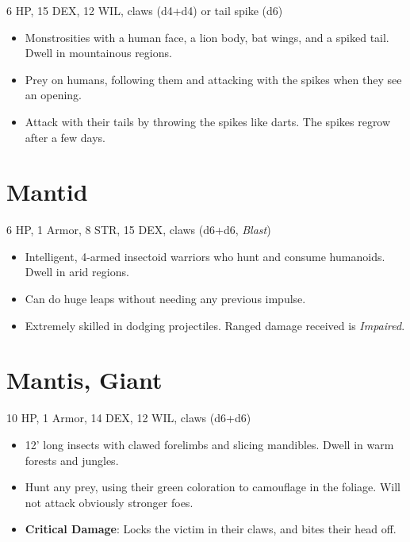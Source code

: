 \documentclass[
  10pt,
  american,
]{article}
\begin{document}
6 HP, 15 DEX, 12 WIL, claws (d4+d4) or tail spike (d6)

\begin{samepage}
\begin{itemize}
\setlength\itemsep{-.5em}
\item Monstrosities with a human face, a lion body, bat wings, and a spiked tail. Dwell in mountainous regions.
\item Prey on humans, following them and attacking with the spikes when they see an opening.
\item Attack with their tails by throwing the spikes like darts. The spikes regrow after a few days.
\end{itemize}
\end{samepage}

\hypertarget{mantid}{%
\section{Mantid}\label{mantid}}

6 HP, 1 Armor, 8 STR, 15 DEX, claws (d6+d6, \emph{Blast})

\begin{samepage}
\begin{itemize}
\setlength\itemsep{-.5em}
\item Intelligent, 4-armed insectoid warriors who hunt and consume humanoids. Dwell in arid regions.
\item Can do huge leaps without needing any previous impulse.
\item Extremely skilled in dodging projectiles. Ranged damage received is \emph{Impaired}.
\end{itemize}
\end{samepage}

\hypertarget{mantis-giant}{%
\section{Mantis, Giant}\label{mantis-giant}}

10 HP, 1 Armor, 14 DEX, 12 WIL, claws (d6+d6)

\begin{samepage}
\begin{itemize}
\setlength\itemsep{-.5em}
\item 12' long insects with clawed forelimbs and slicing mandibles. Dwell in warm forests and jungles.
\item Hunt any prey, using their green coloration to camouflage in the foliage. Will not attack obviously stronger foes.
\item \textbf{Critical Damage}: Locks the victim in their claws, and bites their head off.
\end{itemize}
\end{samepage}
\end{document}
